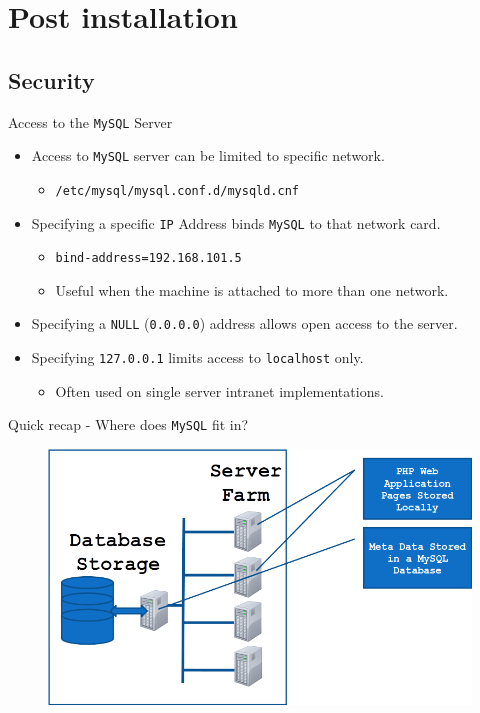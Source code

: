 \documentclass[xcolor=table]{beamer}
\begin{document}
\section{Post installation}
\subsection{Security}
\begin{frame}{Access to the \texttt{MySQL} Server}
  \begin{itemize}
    \item Access to \texttt{MySQL} server can be limited to specific network.
      \begin{itemize}
        \item \texttt{/etc/mysql/mysql.conf.d/mysqld.cnf}
      \end{itemize}
    \item Specifying a specific \texttt{IP} Address binds \texttt{MySQL} to that network card.
      \begin{itemize}
        \item \texttt{bind-address=192.168.101.5}
        \item Useful when the machine is attached to more than one network.
      \end{itemize}
    \item Specifying a \texttt{NULL} (\texttt{0.0.0.0}) address allows open access to the server.
    \item Specifying \texttt{127.0.0.1} limits access to \texttt{localhost} only.
      \begin{itemize}
        \item Often used on single server intranet implementations.
      \end{itemize}
  \end{itemize}
\end{frame}

\begin{frame}{Quick recap - Where does \texttt{MySQL} fit in?}
  \begin{figure}
    \begin{center}
      \includegraphics[width=0.8\linewidth]{MySQLWhere.png}
    \end{center}
  \end{figure}
\end{frame}
\end{document}
